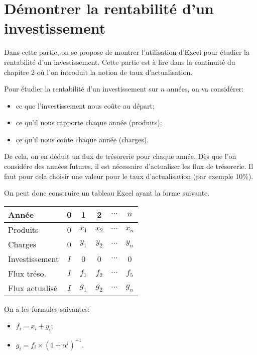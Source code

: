 
\chapter{Démontrer la rentabilité d'un investissement}


Dans cette partie, on se propose de montrer l'utilisation d'Excel 
pour étudier la rentabilité d'un investissement.
Cette partie est à lire dans la continuité du chapitre 2 où l'on introduit 
la notion de taux d'actualisation.

Pour étudier la rentabilité d'un investissement sur $n$ années, 
on va considérer:
\begin{itemize}
  \item ce que l'investissement nous coûte au départ;
  \item ce qu'il nous rapporte chaque année (produits);
  \item ce qu'il nous coûte chaque année (charges).
\end{itemize}

De cela, on en déduit un flux de trésorerie pour chaque année. 
Dès que l'on considére des années futures, il est nécessaire d'actualiser 
les flux de trésorerie. Il faut pour cela choisir une valeur pour le taux 
d'actualisation (par exemple 10\%).

On peut donc construire un tableau Excel ayant la forme suivante.

\begin{center}
\begingroup
\scriptsize
\begin{tabular}{lccccc}
  Année          & 0   & 1     & 2     & $\cdots$ & $n$ \\
  \hline
  Produits       & 0   & $x_1$ & $x_2$ & $\cdots$ & $x_n$ \\
  Charges        & 0   & $y_1$ & $y_2$ & $\cdots$ & $y_n$ \\
  Investissement & $I$ & 0     & 0     & $\cdots$ & 0 \\
  \hline
  Flux tréso.\/  & $I$ & $f_1$ & $f_2$ & $\cdots$ & $f_5$ \\
  Flux actualisé & $I$ & $g_1$ & $g_2$ & $\cdots$ & $g_n$ \\
\end{tabular}
\endgroup
\end{center}

On a les formules suivantes:
\begin{itemize}
  \item $f_i = x_i + y_i$;
  \item $g_i = f_i \times (1 + \alpha^i)^{-1}$.
\end{itemize}

